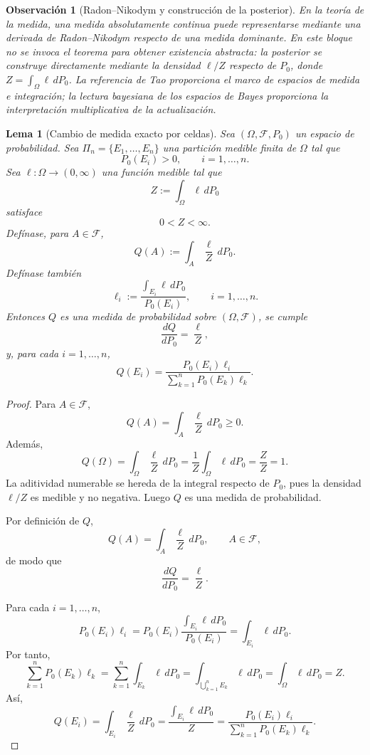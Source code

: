 ﻿\documentclass[12pt]{article}
\newtheorem{lema}{Lema}[section]
\newtheorem{observacion}{Observación}[section]
\begin{document}
\begin{observacion}[Radon--Nikodym y construcción de la posterior]
En la teoría de la medida, una medida absolutamente continua puede representarse mediante una derivada de Radon--Nikodym respecto de una medida dominante. En este bloque no se invoca el teorema para obtener existencia abstracta: la posterior se construye directamente mediante la densidad $\ell/Z$ respecto de $P_0$, donde $Z=\int_\Omega\ell\,dP_0$. La referencia de Tao proporciona el marco de espacios de medida e integración; la lectura bayesiana de los espacios de Bayes proporciona la interpretación multiplicativa de la actualización.
\end{observacion}

\begin{lema}[Cambio de medida exacto por celdas]\label{lem:verosimilitud_cambio_medida}
Sea $(\Omega,\mathcal F,P_0)$ un espacio de probabilidad. Sea $\Pi_n=\{E_1,\dots,E_n\}$ una partición medible finita de $\Omega$ tal que
\[
P_0(E_i)>0,
\qquad i=1,\dots,n.
\]
Sea $\ell:\Omega\to(0,\infty)$ una función medible tal que
\[
Z:=\int_\Omega\ell\,dP_0
\]
satisface
\[
0<Z<\infty.
\]
Defínase, para $A\in\mathcal F$,
\[
Q(A):=\int_A\frac{\ell}{Z}\,dP_0.
\]
Defínase también
\[
\ell_i:=\frac{\displaystyle\int_{E_i}\ell\,dP_0}{P_0(E_i)},
\qquad i=1,\dots,n.
\]
Entonces $Q$ es una medida de probabilidad sobre $(\Omega,\mathcal F)$, se cumple
\[
\frac{dQ}{dP_0}=\frac{\ell}{Z},
\]
y, para cada $i=1,\dots,n$,
\[
Q(E_i)
=
\frac{P_0(E_i)\ell_i}{\displaystyle\sum_{k=1}^nP_0(E_k)\ell_k}.
\]
\end{lema}

\begin{proof}
Para $A\in\mathcal F$,
\[
Q(A)=\int_A\frac{\ell}{Z}\,dP_0\ge 0.
\]
Además,
\[
Q(\Omega)
=
\int_\Omega\frac{\ell}{Z}\,dP_0
=
\frac{1}{Z}\int_\Omega\ell\,dP_0
=
\frac{Z}{Z}
=1.
\]
La aditividad numerable se hereda de la integral respecto de $P_0$, pues la densidad $\ell/Z$ es medible y no negativa. Luego $Q$ es una medida de probabilidad.

Por definición de $Q$,
\[
Q(A)=\int_A\frac{\ell}{Z}\,dP_0,
\qquad A\in\mathcal F,
\]
de modo que
\[
\frac{dQ}{dP_0}=\frac{\ell}{Z}.
\]

Para cada $i=1,\dots,n$,
\[
P_0(E_i)\ell_i
=
P_0(E_i)
\frac{\displaystyle\int_{E_i}\ell\,dP_0}{P_0(E_i)}
=
\int_{E_i}\ell\,dP_0.
\]
Por tanto,
\[
\sum_{k=1}^nP_0(E_k)\ell_k
=
\sum_{k=1}^n\int_{E_k}\ell\,dP_0
=
\int_{\bigcup_{k=1}^nE_k}\ell\,dP_0
=
\int_\Omega\ell\,dP_0
=Z.
\]
Así,
\[
Q(E_i)
=
\int_{E_i}\frac{\ell}{Z}\,dP_0
=
\frac{\displaystyle\int_{E_i}\ell\,dP_0}{Z}
=
\frac{P_0(E_i)\ell_i}{\displaystyle\sum_{k=1}^nP_0(E_k)\ell_k}.
\]
\end{proof}
\end{document}
